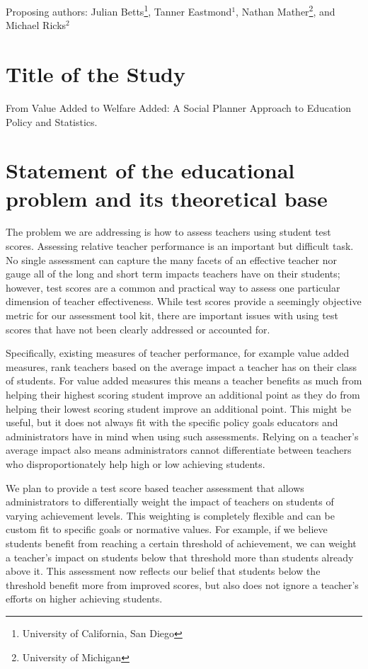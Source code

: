 \documentclass[letterpaper,12pt]{article}
\begin{document}
\noindent Proposing authors: Julian Betts\footnote{University of California, San Diego}, Tanner Eastmond$^1$, Nathan Mather\footnote{University of Michigan}, and Michael Ricks$^2$





\section{Title of the Study}
From Value Added to Welfare Added: A Social Planner Approach to Education Policy and Statistics.





\section{Statement of the educational problem and its theoretical base}
The problem we are addressing is how to assess teachers using student test scores. Assessing relative teacher performance is an important but difficult task. No single assessment can capture the many facets of an effective teacher nor gauge all of the long and short term impacts teachers have on their students; however, test scores are a common and practical way to assess one particular dimension of teacher effectiveness. While test scores provide a seemingly objective metric for our assessment tool kit, there are important issues with using test scores that have not been clearly addressed or accounted for.

Specifically, existing measures of teacher performance, for example value added measures, rank teachers based on the average impact a teacher has on their class of students. For value added measures this means a teacher benefits as much from helping their highest scoring student improve an additional point as they do from helping their lowest scoring student improve an additional point. This might be useful, but it does not always fit with the specific policy goals educators and administrators have in mind when using such assessments. Relying on a teacher's average impact also means administrators cannot differentiate between teachers who disproportionately help high or low achieving students.

We plan to provide a test score based teacher assessment that allows administrators to differentially weight the impact of teachers on students of varying achievement levels. This weighting is completely flexible and can be custom fit to specific goals or normative values. For example, if we believe students benefit from reaching a certain threshold of achievement, we can weight a teacher’s impact on students below that threshold more than students already above it. This assessment now reflects our belief that students below the threshold benefit more from improved scores, but also does not ignore a teacher's efforts on higher achieving students. 
\end{document}
